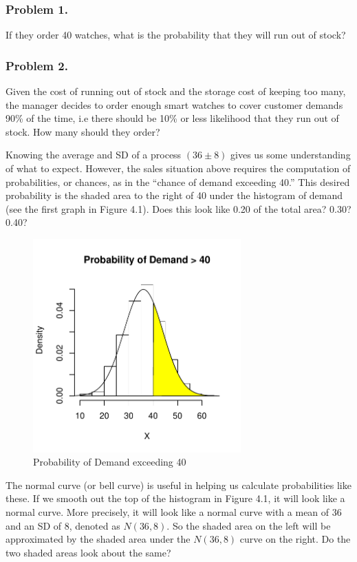 \documentclass[11pt, chapterprefix=true]{scrbook}\usepackage[]{graphicx}\usepackage[]{color}
\begin{document}
\subsubsection{Problem 1.}  If they order 40 watches, what is the probability that they will run out of stock?

\subsubsection{Problem 2.}  Given the cost of running out of stock and the storage cost of keeping too many, the manager decides to order enough smart watches to cover customer demands 90\% of the time, i.e there should be 10\% or less likelihood that they run out of stock. How many should they order?

Knowing the average and SD of a process $(36 \pm 8)$ gives us some understanding of what to expect.  However, the sales situation above requires the computation of probabilities, or chances, as in the ``chance of demand exceeding 40.''   This desired probability is the shaded area to the right of 40 under the histogram of demand (see the first graph in Figure 4.1).  Does this look like 0.20 of the total area?  0.30?  0.40?

\begin{figure}[ht]
\caption{Probability of Demand exceeding 40}


{\centering \includegraphics[width=8cm]{figure/LBL4a-1} 

}



\end{figure}

The normal curve (or bell curve) is useful in helping us calculate probabilities like these.  If we smooth out the top of the histogram in Figure 4.1, it will look like a normal curve.  More precisely, it will look like a normal curve with a mean of 36 and an SD of 8, denoted as $N(36, 8)$.  So the shaded area on the left will be approximated by the shaded area under the $N(36, 8)$ curve on the right.  Do the two shaded areas look about the same?
\end{document}
